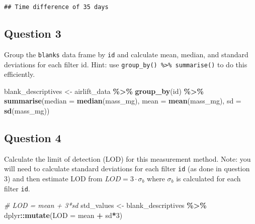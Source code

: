 \documentclass[
]{article}
\newenvironment{Shaded}{\begin{snugshade}}{\end{snugshade}}
\newcommand{\AttributeTok}[1]{\textcolor[rgb]{0.13,0.29,0.53}{#1}}
\newcommand{\CommentTok}[1]{\textcolor[rgb]{0.56,0.35,0.01}{\textit{#1}}}
\newcommand{\DecValTok}[1]{\textcolor[rgb]{0.00,0.00,0.81}{#1}}
\newcommand{\FunctionTok}[1]{\textcolor[rgb]{0.13,0.29,0.53}{\textbf{#1}}}
\newcommand{\NormalTok}[1]{#1}
\newcommand{\OtherTok}[1]{\textcolor[rgb]{0.56,0.35,0.01}{#1}}
\newcommand{\SpecialCharTok}[1]{\textcolor[rgb]{0.81,0.36,0.00}{\textbf{#1}}}
\begin{document}
\begin{verbatim}
## Time difference of 35 days
\end{verbatim}

\hypertarget{question-3}{%
\subsection{Question 3}\label{question-3}}

Group the \texttt{blanks} data frame by \texttt{id} and calculate mean,
median, and standard deviations for each filter id. Hint: use
\texttt{group\_by()\ \%\textgreater{}\%\ summarise()} to do this
efficiently.

\begin{Shaded}
\begin{Highlighting}[]
\NormalTok{blank\_descriptives }\OtherTok{\textless{}{-}}\NormalTok{ airlift\_data }\SpecialCharTok{\%\textgreater{}\%}
  \FunctionTok{group\_by}\NormalTok{(id) }\SpecialCharTok{\%\textgreater{}\%}
  \FunctionTok{summarise}\NormalTok{(}\AttributeTok{median =} \FunctionTok{median}\NormalTok{(mass\_mg),}
            \AttributeTok{mean =} \FunctionTok{mean}\NormalTok{(mass\_mg), }
            \AttributeTok{sd =} \FunctionTok{sd}\NormalTok{(mass\_mg))}
\end{Highlighting}
\end{Shaded}

\hypertarget{question-4}{%
\subsection{Question 4}\label{question-4}}

Calculate the limit of detection (LOD) for this measurement method.
Note: you will need to calculate standard deviations for each filter
\texttt{id} (as done in question 3) and then estimate LOD from
\(LOD = 3\cdot \sigma_b\) where \(\sigma_b\) is calculated for each
filter \texttt{id}.

\begin{Shaded}
\begin{Highlighting}[]
\CommentTok{\# LOD = mean + 3*sd}
\NormalTok{std\_values }\OtherTok{\textless{}{-}}\NormalTok{ blank\_descriptives }\SpecialCharTok{\%\textgreater{}\%}
\NormalTok{  dplyr}\SpecialCharTok{::}\FunctionTok{mutate}\NormalTok{(}\AttributeTok{LOD =}\NormalTok{ mean }\SpecialCharTok{+}\NormalTok{ sd}\SpecialCharTok{*}\DecValTok{3}\NormalTok{)}
\end{Highlighting}
\end{Shaded}
\end{document}
